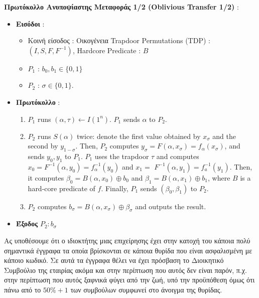 \begin{definition}
\textbf{Πρωτόκολλο Ανυποψίαστης Μεταφοράς 1/2 (Oblivious Transfer 1/2)} : 
\begin{itemize}
\item \textbf{Εισόδοι} : 

\begin{itemize}
\item Κοινή είσοδος : Οικογένεια Trapdoor Permutations (TDP) : $(I, S, F, F^{-1})$, Hardcore Predicate : $B$
\item $P_{1}$ : $b_{0}, b_{1} \in\{0,1\}$
\item $P_{2}$ : $\sigma \in\{0,1\}$.
\end{itemize}

\item \textbf{Πρωτόκολλο} :
\begin{enumerate}
\item $P_{1}$ runs $(\alpha, \tau) \leftarrow I\left(1^{n}\right)$. $P_{1}$ sends $\alpha$ to $P_{2}$.
\item $P_{2}$ runs $S(\alpha)$ twice: denote the first value obtained by $x_{\sigma}$ and the second by $y_{1-\sigma}$. Then, $P_{2}$ computes $y_{\sigma}=F\left(\alpha, x_{\sigma}\right)=f_{\alpha}\left(x_{\sigma}\right)$, and sends $y_{0}, y_{1}$ to $P_{1}$.
\ite  $P_{1}$ uses the trapdoor $\tau$ and computes $x_{0}=F^{-1}\left(\alpha, y_{0}\right)=f_{\alpha}^{-1}\left(y_{0}\right)$ and $x_{1}=$ $F^{-1}\left(\alpha, y_{1}\right)=f_{a}^{-1}\left(y_{1}\right)$. Then, it computes $\beta_{0}=B\left(\alpha, x_{0}\right) \oplus b_{0}$ and $\beta_{1}=B\left(\alpha, x_{1}\right) \oplus b_{1}$, where $B$ is a hard-core predicate of $f$. Finally, $P_{1}$ sends $\left(\beta_{0}, \beta_{1}\right)$ to $P_{2}$.
\item $P_{2}$ computes $b_{\sigma}=B\left(\alpha, x_{\sigma}\right) \oplus \beta_{\sigma}$ and outputs the result.
\end{enumerate}

\item \textbf{Έξοδος}
$P_{2} : b_σ$
\end{itemize}
\end{definition}

Ας υποθέσουμε ότι ο ιδιοκτήτης μιας επιχείρησης έχει στην κατοχή του κάποια πολύ σημαντικά έγγραφα τα οποία βρίσκονται σε κάποια θυρίδα που είναι ασφαλισμένη με κάποιο κωδικό. Σε αυτά τα έγγραφα θέλει να έχει πρόσβαση το Διοικητικό Συμβούλιο της εταιρίας ακόμα και στην περίπτωση που αυτός δεν είναι παρόν, π.χ. στην περίπτωση που αυτός ξαφνικά φύγει από την ζωή, υπό την προϋπόθεση όμως ότι πάνω από το $50\%+1$ των συμβούλων συμφωνεί στο άνοιγμα της θυρίδας. 

